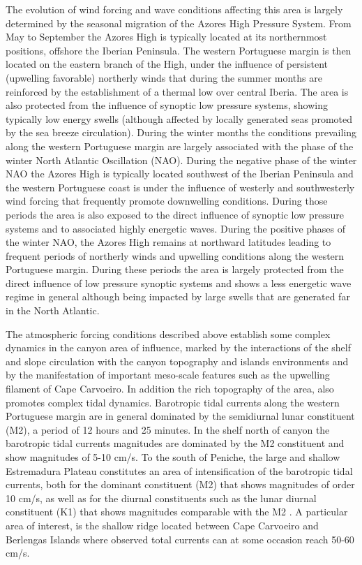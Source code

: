 The evolution of wind forcing and wave conditions affecting this area
is largely determined by the seasonal migration of the Azores High
Pressure System. From May to September the Azores High is typically
located at its northernmost positions, offshore the Iberian
Peninsula. The western Portuguese margin is then located on the
eastern branch of the High, under the influence of persistent
(upwelling favorable) northerly winds that during the summer months
are reinforced by the establishment of a thermal low over central
Iberia. The area is also protected from the influence of synoptic low
pressure systems, showing typically low energy swells (although
affected by locally generated seas promoted by the sea breeze
circulation). During the winter months the conditions prevailing along
the western Portuguese margin are largely associated with the phase of
the winter North Atlantic Oscillation (NAO). During the negative phase
of the winter NAO the Azores High is typically located southwest of
the Iberian Peninsula and the western Portuguese coast is under the
influence of westerly and southwesterly wind forcing that frequently
promote downwelling conditions. During those periods the area is also
exposed to the direct influence of synoptic low pressure systems and
to associated highly energetic waves. During the positive phases of
the winter NAO, the Azores High remains at northward latitudes leading
to frequent periods of northerly winds and upwelling conditions along
the western Portuguese margin. During these periods the area is
largely protected from the direct influence of low pressure synoptic
systems and shows a less energetic wave regime in general although
being impacted by large swells that are generated far in the North
Atlantic.

The atmospheric forcing conditions described above establish some
complex dynamics in the \naz canyon area of influence, marked by the
interactions of the shelf and slope circulation with the canyon
topography and islands environments and by the manifestation of
important meso-scale features such as the upwelling filament of Cape
Carvoeiro. In addition the rich topography of the area, also promotes
complex tidal dynamics. Barotropic tidal currents along the western
Portuguese margin are in general dominated by the semidiurnal lunar
constituent (M2), a period of 12 hours and 25 minutes.  In the shelf
north of \naz canyon the barotropic tidal currents magnitudes are
dominated by the M2 constituent and show magnitudes of 5-10 cm/s. To
the south of Peniche, the large and shallow Estremadura Plateau
constitutes an area of intensification of the barotropic tidal
currents, both for the dominant constituent (M2) that shows magnitudes
of order 10 cm/s, as well as for the diurnal constituents such as the
lunar diurnal constituent (K1) that shows magnitudes comparable with
the M2 \cite{marta06,quaresma13}. A particular area of interest, is
the shallow ridge located between Cape Carvoeiro and Berlengas Islands
where observed total currents can at some occasion reach 50-60 cm/s.


